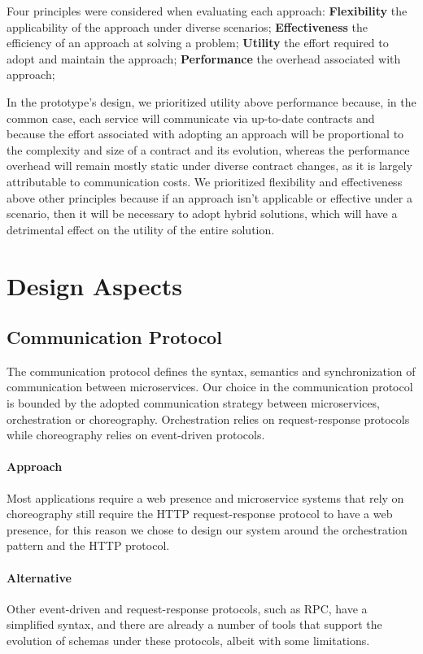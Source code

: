 Four principles were considered when evaluating each approach:
\textbf{Flexibility} the applicability of the approach under diverse scenarios;
\textbf{Effectiveness} the efficiency of an approach at solving a problem;
\textbf{Utility} the effort required to adopt and maintain the approach;
\textbf{Performance} the overhead associated with approach;

In the prototype's design, we prioritized utility above performance because,
in the common case, each service will communicate via up-to-date contracts and
because the effort associated with adopting an approach will be proportional to the complexity and size of a contract and its evolution,
whereas the performance overhead will remain mostly static under diverse contract changes, as it is largely attributable to communication costs.
We prioritized flexibility and effectiveness above other principles because if an approach isn't applicable or effective under a scenario,
then it will be necessary to adopt hybrid solutions, which will have a detrimental effect on the utility of the entire solution.

\section{Design Aspects} %
\label{sec:design_aspects}

\subsection{Communication Protocol} %
\label{sec:communication_protocol}

The communication protocol defines the syntax, semantics and synchronization of communication between microservices.
Our choice in the communication protocol is bounded by the adopted communication strategy between microservices, orchestration or choreography.
Orchestration relies on request-response protocols while choreography relies on event-driven protocols.

\paragraph{Approach}
Most applications require a web presence and microservice systems that
rely on choreography still require the HTTP request-response protocol to have a web presence,
for this reason we chose to design our system around the orchestration pattern and the HTTP protocol.

\paragraph{Alternative}
Other event-driven and request-response protocols, such as RPC, have a simplified
syntax, and there are already a number of tools that support the evolution of schemas
under these protocols, albeit with some limitations.

